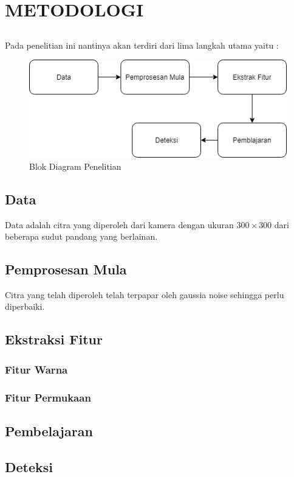 \chapter{METODOLOGI}
\label{sec:chap3_metodologi}

\section*{ }
Pada penelitian ini nantinya akan terdiri dari lima langkah utama yaitu :
\begin{figure}[H]
	\centering
	\includegraphics[width=\linewidth]{bab3/BlokDiagram}
	\caption{Blok Diagram Penelitian}
	\label{fig:blokdiagram}
\end{figure}


\section{Data}
Data adalah citra yang diperoleh dari kamera dengan ukuran $300\times 300$ dari beberapa sudut pandang yang berlainan.
\section{Pemprosesan Mula}
Citra yang telah diperoleh telah terpapar oleh gaussia noise sehingga perlu diperbaiki.
\section{Ekstraksi Fitur}
\lipsum[2]
\subsection{Fitur Warna}
\lipsum[1]
\subsection{Fitur Permukaan}
\section{Pembelajaran}
\lipsum[4]
\section{Deteksi}
\lipsum[2]






